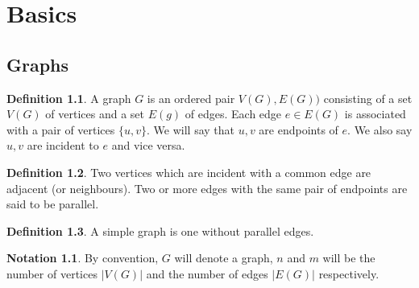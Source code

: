 \documentclass{book}
\theoremstyle{definition}
\newtheorem*{defn}{Definition}
\newtheorem*{nota}{Notation}
\begin{document}
\maketitle

\chapter{Basics}
\section{Graphs}
\begin{defn}
A graph $G$ is an ordered pair $V(G),E(G))$ consisting of a set $V(G)$ of vertices and a set $E(g)$ of edges.
Each edge $e\in E(G)$ is associated with a pair of vertices $\{u,v\}$.
We will say that $u,v$ are endpoints of $e$.
We also say $u,v$ are incident to $e$ and vice versa.
\end{defn}
\begin{defn}
Two vertices which are incident with a common edge are adjacent (or neighbours).
Two or more edges with the same pair of endpoints are said to be parallel.
\end{defn}
\begin{defn}
A simple graph is one without parallel edges.
\end{defn}
\begin{nota}
By convention, $G$ will denote a graph, $n$ and $m$ will be the number of vertices $|V(G)|$ and the number of edges $|E(G)|$ respectively.
\end{nota}
\end{document}
